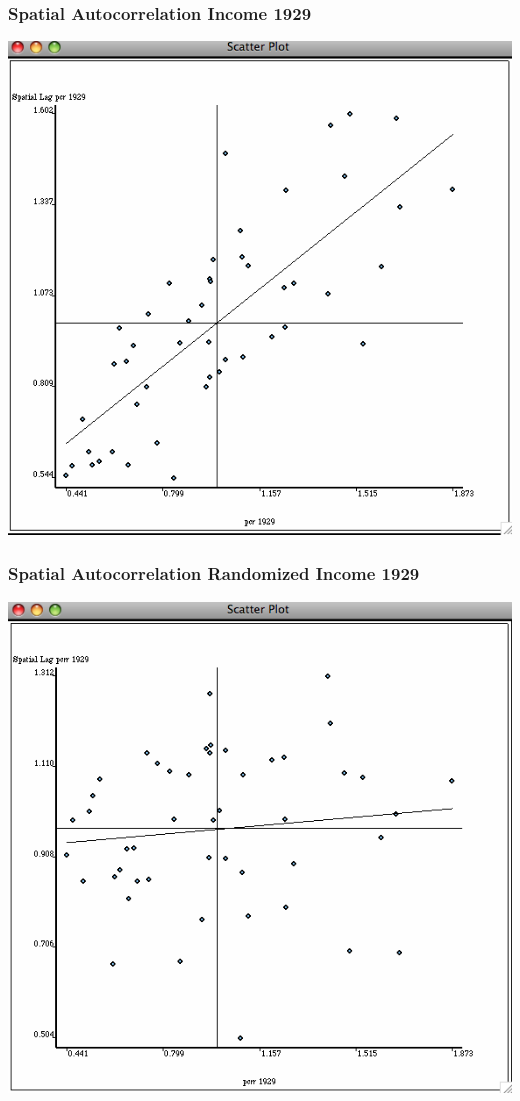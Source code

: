 \documentclass[nototal]{beamer}
\begin{document}
\begin{frame}
	\frametitle{Spatial Autocorrelation Income 1929}
 \begin{center}
 \includegraphics[width=.65\linewidth]{moran29.png}
  \end{center}
 \end{frame} 

\begin{frame}
	\frametitle{Spatial Autocorrelation Randomized Income 1929}
 \begin{center}
 \includegraphics[width=.65\linewidth]{moran29random.png}
  \end{center}
 \end{frame} 
\end{document}

